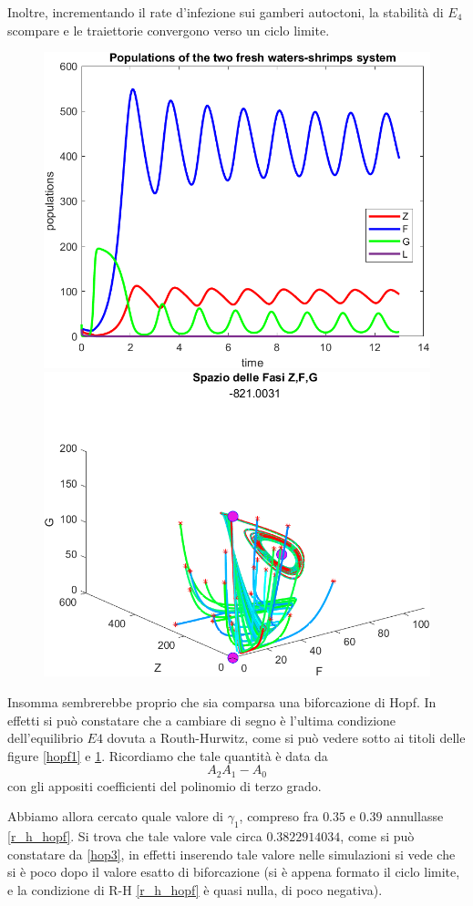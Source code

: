 \documentclass[12pt,a4paper]{article}
\numberwithin{theorem}{section}
\numberwithin{definition}{section}
\numberwithin{example}{section}
\begin{document}
Inoltre, incrementando il rate d'infezione sui gamberi autoctoni, la stabilità di $E_4$ scompare e le traiettorie convergono verso un ciclo limite. 



\begin{figure}[h!]
    \centering
    \includegraphics[width=8 cm]{grafici/hopf_dopo_popolazioni.png} 
    \includegraphics[width=8 cm]{grafici/hopf_dopo_fasi.png}
    \label{hopf2}
\end{figure}

Insomma sembrerebbe proprio che sia comparsa una biforcazione di Hopf. In effetti si può constatare che a cambiare di segno è l'ultima condizione dell'equilibrio $E4$ dovuta a Routh-Hurwitz, come si può vedere sotto ai titoli delle figure \ref{hopf1} e \ref{hopf2}. Ricordiamo che tale quantità è data da
\begin{equation}
\label{r_h_hopf}
    A_2A_1-A_0
\end{equation}
con gli appositi coefficienti del polinomio di terzo grado.

Abbiamo allora cercato quale valore di $\gamma_1$, compreso fra $0.35$ e $0.39$ annullasse \ref{r_h_hopf}. Si trova che tale valore vale circa $0.3822914034$, come si può constatare da \ref{hop3}, in effetti inserendo tale valore nelle simulazioni si vede che si è poco dopo il valore esatto di biforcazione (si è appena formato il ciclo limite, e la condizione di R-H \ref{r_h_hopf} è quasi nulla, di poco negativa).
\end{document}
